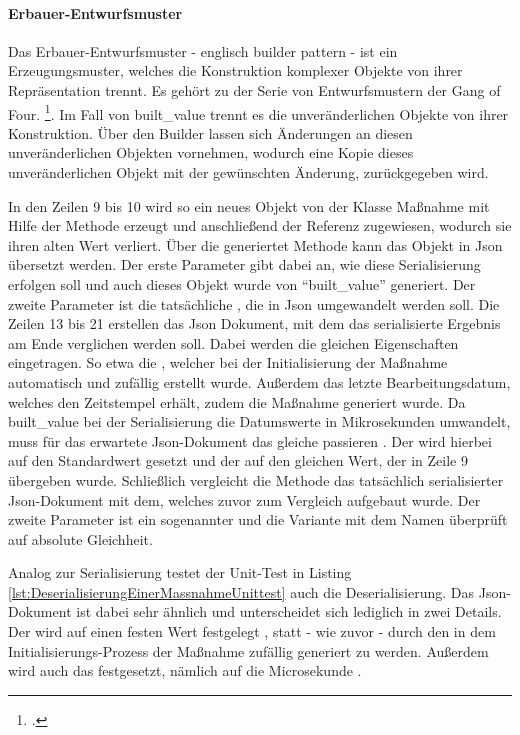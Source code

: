 \paragraph{Erbauer-Entwurfsmuster} Das Erbauer-Entwurfsmuster - englisch builder pattern - ist ein Erzeugungsmuster, welches die Konstruktion komplexer Objekte von ihrer Repräsentation trennt. Es gehört zu der Serie von Entwurfsmustern der Gang of Four. \footcite[Vgl.][S. 119]{gamma2009entwurfsmuster}. Im Fall von built_value trennt es die unveränderlichen Objekte von ihrer Konstruktion. Über den Builder lassen sich Änderungen an diesen unveränderlichen Objekten vornehmen, wodurch eine Kopie dieses unveränderlichen Objekt mit der gewünschten Änderung, zurückgegeben wird.

In den Zeilen 9 bis 10 wird so ein neues Objekt von der Klasse Maßnahme mit Hilfe der Methode  erzeugt und anschließend der Referenz  zugewiesen, wodurch sie ihren alten Wert verliert. Über die generiertet Methode   kann das Objekt in Json übersetzt werden. Der erste Parameter  gibt dabei an, wie diese Serialisierung erfolgen soll und auch dieses Objekt wurde von \enquote{built_value} generiert. Der zweite Parameter ist die tatsächliche , die in Json umgewandelt werden soll. Die Zeilen 13 bis 21 erstellen das Json Dokument, mit dem das serialisierte Ergebnis am Ende verglichen werden soll. Dabei werden die gleichen Eigenschaften eingetragen. So etwa die , welcher bei der Initialisierung der Maßnahme automatisch und zufällig erstellt wurde. Außerdem das letzte Bearbeitungsdatum, welches den Zeitstempel erhält, zudem die Maßnahme generiert wurde. Da built_value bei der Serialisierung die Datumswerte in Mikrosekunden umwandelt, muss für das erwartete Json-Dokument das gleiche passieren . Der   wird hierbei auf den Standardwert  gesetzt und der   auf den gleichen Wert, der in Zeile 9 übergeben wurde.
Schließlich vergleicht die Methode  das tatsächlich serialisierter Json-Dokument mit dem, welches zuvor zum Vergleich aufgebaut wurde. Der zweite Parameter ist ein sogenannter  und die Variante mit dem Namen  überprüft auf absolute Gleichheit.



Analog zur Serialisierung testet der Unit-Test in Listing \ref{lst:DeserialisierungEinerMassnahmeUnittest} auch die Deserialisierung. Das Json-Dokument ist dabei sehr ähnlich und unterscheidet sich lediglich in zwei Details. Der  wird auf einen festen Wert festgelegt , statt - wie zuvor - durch den in dem Initialisierungs-Prozess der Maßnahme zufällig generiert zu werden. Außerdem wird auch das  festgesetzt, nämlich auf die Microsekunde  .

